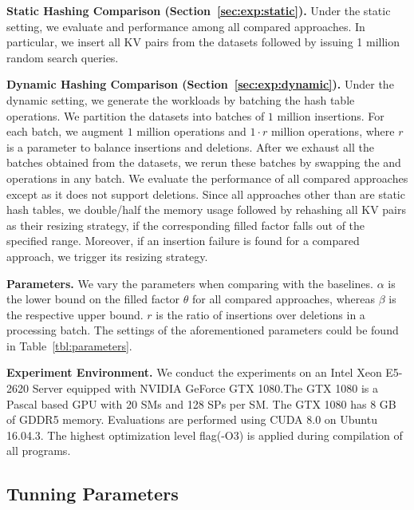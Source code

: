 \vspace{1mm}\noindent\textbf{Static Hashing Comparison (Section~\ref{sec:exp:static}).}
Under the static setting, we evaluate  and  performance among all compared approaches. 
In particular, we insert all KV pairs from the datasets followed by issuing 1 million random search queries. 

\vspace{1mm}\noindent\textbf{Dynamic Hashing Comparison (Section~\ref{sec:exp:dynamic}).}
Under the dynamic setting, we generate the workloads by batching the hash table operations. 
We partition the datasets into batches of $1$ million insertions. 
For each batch, we augment $1$ million  operations and $1 \cdot r$ million  operations,
where $r$ is a parameter to balance insertions and deletions.
After we exhaust all the batches obtained from the datasets, we rerun these batches by swapping the  and  operations in any batch. 
We evaluate the performance of all compared approaches except \cudpp as it does not support deletions. 
Since all approaches other than \voter are static hash tables, we double/half the memory usage followed by rehashing all KV pairs as their resizing strategy, if the corresponding filled factor falls out of the specified range. 
Moreover, if an insertion failure is found for a compared approach, we trigger its resizing strategy.


\vspace{1mm}\noindent\textbf{Parameters.}
We vary the parameters when comparing \voter with the baselines.
$\alpha$ is the lower bound on the filled factor $\theta$ for all compared approaches,
whereas $\beta$ is the respective upper bound.
$r$ is the ratio of insertions over deletions in a processing batch. 
The settings of the aforementioned parameters could be found in Table~\ref{tbl:parameters}.

\vspace{1mm}\noindent\textbf{Experiment Environment.}
We conduct the experiments on an Intel Xeon E5-2620 Server equipped with NVIDIA GeForce GTX 1080.The GTX 1080 is a Pascal based GPU with 20 SMs and 128 SPs per SM. The GTX 1080 has 8 GB of GDDR5 memory. Evaluations are performed using CUDA 8.0 on Ubuntu 16.04.3. The highest optimization level flag(-O3) is applied during compilation of all programs.


\subsection{Tunning Parameters}

